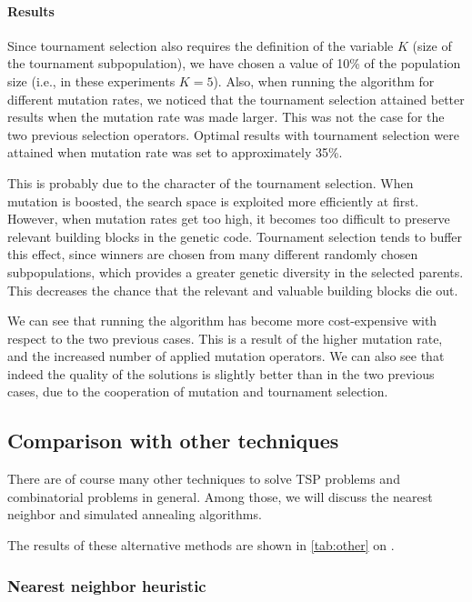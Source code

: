 \documentclass[a4paper,english,11pt,]{scrartcl}
\begin{document}
\paragraph{Results}
Since tournament selection also requires the definition of the variable $K$ (size of the tournament subpopulation), we have chosen a value of 10\% of the population size (i.e., in these experiments $K=5$). Also, when running the algorithm for different mutation rates, we noticed that the tournament selection attained better results when the mutation rate was made larger. This was not the case for the two previous selection operators. Optimal results with tournament selection were attained when mutation rate was set to approximately 35\%. 

% 


This is probably due to the character of the tournament selection. When mutation is boosted, the search space is exploited more efficiently at first. However, when mutation rates get too high, it becomes too difficult to preserve relevant building blocks in the genetic code. Tournament selection tends to buffer this effect, since winners are chosen from many different randomly chosen subpopulations, which provides a greater genetic diversity in the selected parents. This decreases the chance that the relevant and valuable building blocks die out.

We can see that running the algorithm has become more cost-expensive with respect to the two previous cases. This is a result of the higher mutation rate, and the increased number of applied mutation operators. We can also see that indeed the quality of the solutions is slightly better than in the two previous cases, due to the cooperation of mutation and tournament selection. 


\subsection{Comparison with other techniques}
There are of course many other techniques to solve TSP problems and combinatorial problems in general.
Among those, we will discuss the nearest neighbor and simulated annealing algorithms.

The results of these alternative methods are shown in \autoref{tab:other} on .

\subsubsection{Nearest neighbor heuristic}
\end{document}
